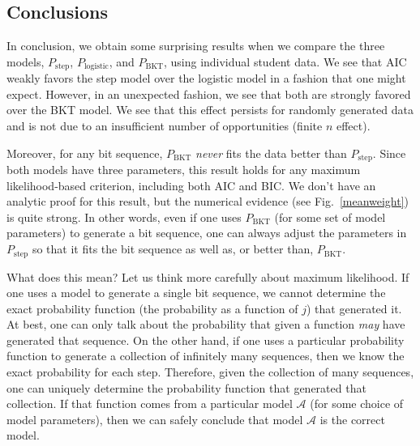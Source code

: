 \documentclass{edm_template}
\begin{document}
\subsection{Conclusions}

In conclusion, we obtain some surprising results when we compare
the three models,  $P_\mathrm{step}$, $P_\mathrm{logistic}$, and
$P_\mathrm{BKT}$, using individual student data.   We see that AIC
weakly favors the step model over the logistic model in a fashion 
that one might expect.  However, in an unexpected fashion, we see 
that both are strongly favored over the BKT model.
We see that this effect persists for
randomly generated data and is not due to an insufficient number
of opportunities (finite $n$ effect).

Moreover, for any bit sequence,  $P_\mathrm{BKT}$ {\em never}
fits the data better than $P_\mathrm{step}$.  Since 
both models have three parameters, this result holds for any maximum
likelihood-based criterion, including both AIC and BIC.  We don't have
an analytic proof for this result, 
but the numerical evidence (see Fig.~\ref{meanweight}) is quite strong.
In other words, even if one uses $P_\mathrm{BKT}$ (for some set of model parameters) 
to generate a bit sequence, one can
always adjust the parameters in $P_\mathrm{step}$ so that it
fits the bit sequence as well as, or better than, $P_\mathrm{BKT}$.



What does this mean?  Let us think
more carefully about maximum likelihood.
If one uses a model to generate a single bit sequence, we cannot 
determine the exact probability function (the probability as a
function of $j$) that generated it.  At best, one can only
talk about the probability that given a function {\em may} have 
generated that sequence.
On the other hand, if one uses a particular probability function to generate a collection 
of infinitely many sequences, then we know the exact probability for each step.
Therefore, given the collection of many sequences, one can uniquely 
determine the probability function that generated that collection. 
If that function comes from a
particular model $\mathcal{A}$ (for some choice of model parameters),
then we can safely conclude that model $\mathcal{A}$ is the correct model.
\end{document}
